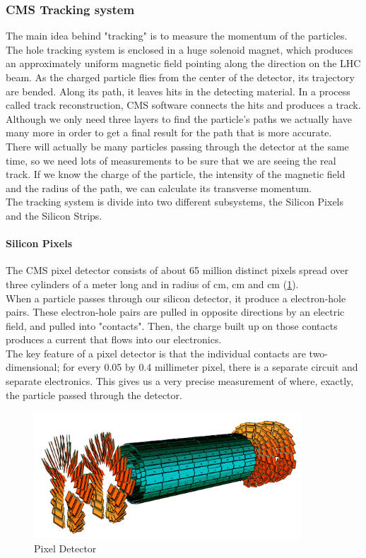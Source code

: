 \subsubsection{CMS Tracking system}

The main idea behind "tracking" is to measure the momentum of the particles. The hole tracking system is enclosed in a huge solenoid magnet, which produces an approximately uniform magnetic field pointing along the direction on the LHC beam. As the charged particle flies from the center of the detector, its trajectory are bended. Along its path, it leaves hits in the detecting material.
In a process called track reconstruction, CMS software connects the hits and produces a track. Although we only need three layers to find the particle's paths we actually have many more in order to get a final result for the path that is more accurate.\\
\indent
There will actually be many particles passing through the detector at the same time, so we need lots of measurements to be sure that we are seeing the real track.
If we know the charge of the particle, the intensity of the magnetic field and the radius of the path, we can calculate its transverse momentum.\\
\indent
The tracking system is divide into two different subsystems, the Silicon Pixels and the Silicon Strips.

\paragraph{Silicon Pixels} The CMS pixel detector consists of about 65 million distinct pixels spread over three cylinders of a meter long and in radius of \unit[4]{cm}, \unit[7]{cm} and \unit[10]{cm} (\cref{fig:pixel}).\\
\indent
When a particle passes through our silicon detector, it produce a electron-hole pairs. These electron-hole pairs are pulled in opposite directions by an electric field, and pulled into "contacts". Then, the charge built up on those contacts produces a current that flows into our electronics.\\
\indent 
The key feature of a pixel detector is that the individual contacts are two-dimensional; for every 0.05 by 0.4 millimeter pixel, there is a separate circuit and separate electronics. This gives us a very precise measurement of where, exactly, the particle passed through the detector.
\begin{figure}[H]
  \centering
\includegraphics[width=10cm]{CMS_chapter_plots/pixel2}
  \caption{Pixel Detector \label{fig:pixel}}
\end{figure}


